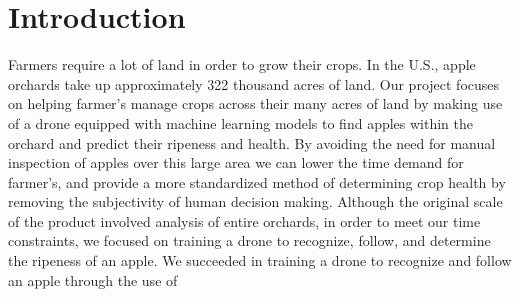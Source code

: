 \section{Introduction}
Farmers require a lot of land in order to grow their crops.  %
In the U.S., apple orchards take up approximately 322 thousand acres of land. %
Our project focuses on helping farmer's manage crops across their many acres of land by making use of a drone equipped with machine learning models to 
find apples within the orchard and predict their ripeness and health. By avoiding the need for manual inspection of apples over this large area 
we can lower the time demand for farmer's, and provide a more standardized method of determining crop health by removing the subjectivity of human decision making.
Although the original scale of the product involved analysis of entire orchards, in order to meet our time constraints, we focused on training a drone to recognize, follow, and determine the ripeness of an apple. We succeeded in training a drone to recognize and follow an apple through the use of 
\\
